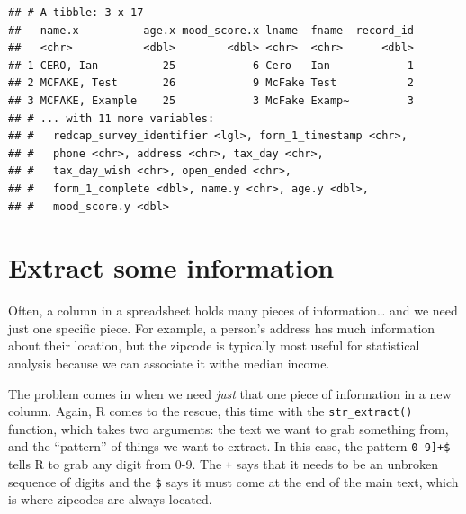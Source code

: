 \documentclass[
]{book}
\newenvironment{Shaded}{\begin{snugshade}}{\end{snugshade}}
\newcommand{\AttributeTok}[1]{\textcolor[rgb]{0.77,0.63,0.00}{#1}}
\newcommand{\FunctionTok}[1]{\textcolor[rgb]{0.00,0.00,0.00}{#1}}
\newcommand{\NormalTok}[1]{#1}
\newcommand{\SpecialCharTok}[1]{\textcolor[rgb]{0.00,0.00,0.00}{#1}}
\newcommand{\StringTok}[1]{\textcolor[rgb]{0.31,0.60,0.02}{#1}}
\begin{document}
\begin{verbatim}
## # A tibble: 3 x 17
##   name.x          age.x mood_score.x lname  fname  record_id
##   <chr>           <dbl>        <dbl> <chr>  <chr>      <dbl>
## 1 CERO, Ian          25            6 Cero   Ian            1
## 2 MCFAKE, Test       26            9 McFake Test           2
## 3 MCFAKE, Example    25            3 McFake Examp~         3
## # ... with 11 more variables:
## #   redcap_survey_identifier <lgl>, form_1_timestamp <chr>,
## #   phone <chr>, address <chr>, tax_day <chr>,
## #   tax_day_wish <chr>, open_ended <chr>,
## #   form_1_complete <dbl>, name.y <chr>, age.y <dbl>,
## #   mood_score.y <dbl>
\end{verbatim}

\hypertarget{extract-some-information}{%
\section{Extract some information}\label{extract-some-information}}

Often, a column in a spreadsheet holds many pieces of information\ldots{} and we need just one specific piece. For example, a person's address has much information about their location, but the zipcode is typically most useful for statistical analysis because we can associate it withe median income.

The problem comes in when we need \emph{just} that one piece of information in a new column. Again, R comes to the rescue, this time with the \texttt{str\_extract()} function, which takes two arguments: the text we want to grab something from, and the ``pattern'' of things we want to extract. In this case, the pattern \texttt{\textquotesingle{}{[}0-9{]}+\$\textquotesingle{}} tells R to grab any digit from 0-9. The \texttt{+} says that it needs to be an unbroken sequence of digits and the \texttt{\$} says it must come at the end of the main text, which is where zipcodes are always located.

\begin{Shaded}
\end{Shaded}
\end{document}
